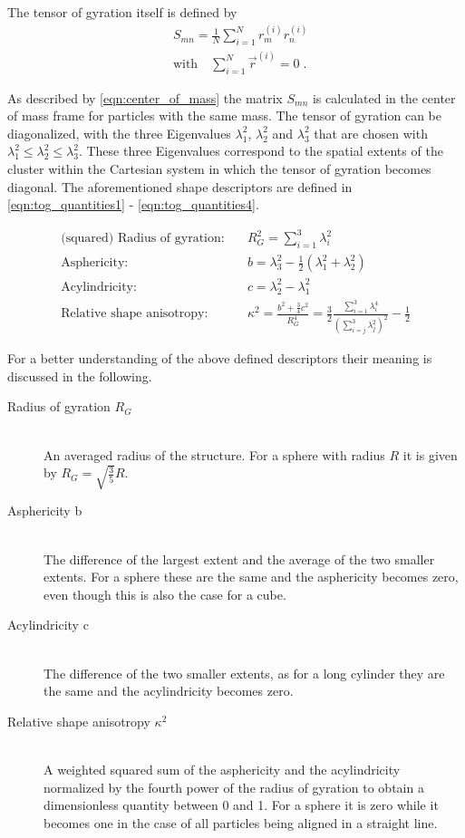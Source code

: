The tensor of gyration itself is defined by
\begin{align}
\label{eqn:tensor_of_gyration}
&S_{mn}=\frac{1}{N} \sum_{i=1}^{N} r^{(i)}_m r^{(i)}_n\\
\label{eqn:center_of_mass}
&\text{with} \quad \sum_{i=1}^{N} \vec{r}^{(i)} = 0 \; \text{.}
\end{align}

As described by \autoref{eqn:center_of_mass} the matrix $S_{mn}$ is calculated in the center of mass frame for particles with the same mass. The tensor of gyration can be diagonalized, with the three Eigenvalues $\lambda_1^2$, $\lambda_2^2$ and $\lambda_3^2$ that are chosen with $\lambda_1^2 \leq \lambda_2^2 \leq \lambda_3^2 $. These three Eigenvalues correspond to the spatial extents of the cluster within the Cartesian system in which the tensor of gyration becomes diagonal. The aforementioned shape descriptors are defined in \autoref{eqn:tog_quantities1} - \ref{eqn:tog_quantities4}.

\begin{align}
\label{eqn:tog_quantities1}
\text{(squared) Radius of gyration:} \quad &R_G^2 = \sum_{i=1}^3 \lambda_i^2\\
\label{eqn:tog_quantities2}
\text{Asphericity:} \quad &b = \lambda_3^2 - \frac{1}{2}(\lambda_1^2+\lambda_2^2)\\
\label{eqn:tog_quantities3}
\text{Acylindricity:} \quad &c = \lambda_2^2 - \lambda_1^2\\
\label{eqn:tog_quantities4}
\text{Relative shape anisotropy:} \quad &\kappa^2 = \frac{b^2 + \frac{3}{4} c^2 }{R_G^4} =  \frac{3}{2} \frac{ \sum_{i=1}^3 \lambda_i^4 }{\left(\sum_{i=j}^3 \lambda_j^2 \right) ^2 } - \frac{1}{2}
\end{align}

For a better understanding of the above defined descriptors their meaning is discussed in the following.

\begin{description}
\item[Radius of gyration $R_G$] \hfill \\ An averaged radius of the structure. For a sphere with radius $R$ it is given by $R_G = \sqrt{\frac{3}{5}} R$.
\item[Asphericity b]\hfill \\ The difference of the largest extent and the average of the two smaller extents. For a sphere these are the same and the asphericity becomes zero, even though this is also the case for a cube.  
\item[Acylindricity c] \hfill \\ The difference of the two smaller extents, as for a long cylinder they are the same and the acylindricity becomes zero.
\item[Relative shape anisotropy $\kappa^2$] \hfill \\ A weighted squared sum of the asphericity and the acylindricity normalized by the fourth power of the radius of gyration to obtain a dimensionless quantity between 0 and 1. For a sphere it is zero while it becomes one in the case of all particles being aligned in a straight line.
\end{description}

